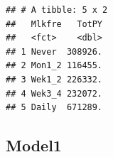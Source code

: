 \documentclass[
]{article}
\newenvironment{Shaded}{\begin{snugshade}}{\end{snugshade}}
\newcommand{\DataTypeTok}[1]{\textcolor[rgb]{0.13,0.29,0.53}{#1}}
\newcommand{\KeywordTok}[1]{\textcolor[rgb]{0.13,0.29,0.53}{\textbf{#1}}}
\newcommand{\NormalTok}[1]{#1}
\newcommand{\OperatorTok}[1]{\textcolor[rgb]{0.81,0.36,0.00}{\textbf{#1}}}
\newcommand{\OtherTok}[1]{\textcolor[rgb]{0.56,0.35,0.01}{#1}}
\newcommand{\StringTok}[1]{\textcolor[rgb]{0.31,0.60,0.02}{#1}}
\begin{document}
\begin{verbatim}
## # A tibble: 5 x 2
##   Mlkfre   TotPY
##   <fct>    <dbl>
## 1 Never  308926.
## 2 Mon1_2 116455.
## 3 Wek1_2 226332.
## 4 Wek3_4 232072.
## 5 Daily  671289.
\end{verbatim}

\hypertarget{model1}{%
\subsection{Model1}\label{model1}}

\begin{Shaded}
\end{Shaded}
\end{document}
